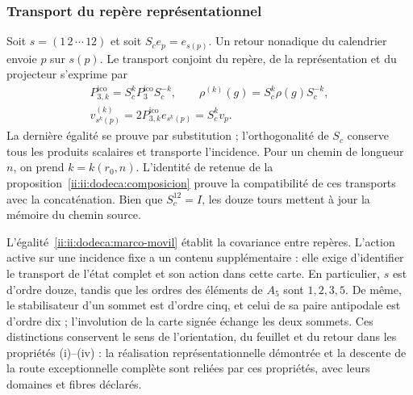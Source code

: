 \subsubsection{Transport du repère représentationnel}
\label{ii:ii:dodeca:marco}
Soit \(s=(1\,2\,\cdots\,12)\) et soit \(S_ce_p=e_{s(p)}\).
Un retour nonadique du calendrier envoie \(p\) sur \(s(p)\). Le transport
conjoint du repère, de la représentation et du projecteur s’exprime par
\begin{equation}
 \begin{gathered}
 P_{3,k}^{\mathrm{ico}}=S_c^kP_3^{\mathrm{ico}}S_c^{-k},\qquad
 \rho^{(k)}(g)=S_c^k\rho(g)S_c^{-k},\\
 v^{(k)}_{s^k(p)}=2P_{3,k}^{\mathrm{ico}}e_{s^k(p)}=S_c^kv_p.
 \end{gathered}
 \label{ii:ii:dodeca:marco-movil}
\end{equation}
La dernière égalité se prouve par substitution ; l’orthogonalité de
\(S_c\) conserve tous les produits scalaires et transporte
l’incidence. Pour un chemin de longueur \(n\), on prend
\(k=k(r_0,n)\). L’identité de retenue de la
proposition~\ref{ii:ii:dodeca:composicion} prouve la compatibilité de
ces transports avec la concaténation. Bien que \(S_c^{12}=I\),
les douze tours mettent à jour la mémoire du chemin source.

L’égalité~\eqref{ii:ii:dodeca:marco-movil} établit la covariance entre
repères. L’action active sur une incidence fixe a un contenu
supplémentaire : elle exige d’identifier le transport de l’état complet et son
action dans cette carte. En particulier, \(s\) est d’ordre douze, tandis
que les ordres des éléments de \(A_5\) sont \(1,2,3,5\).
De même, le stabilisateur d’un sommet est d’ordre cinq, et celui de sa
paire antipodale est d’ordre dix ; l’involution de la carte signée
échange les deux sommets. Ces distinctions conservent le sens
de l’orientation, du feuillet et du retour dans les propriétés (i)--(iv) : la
réalisation représentationnelle démontrée et la descente de la route
exceptionnelle complète sont reliées par ces propriétés, avec leurs
domaines et fibres déclarés.



